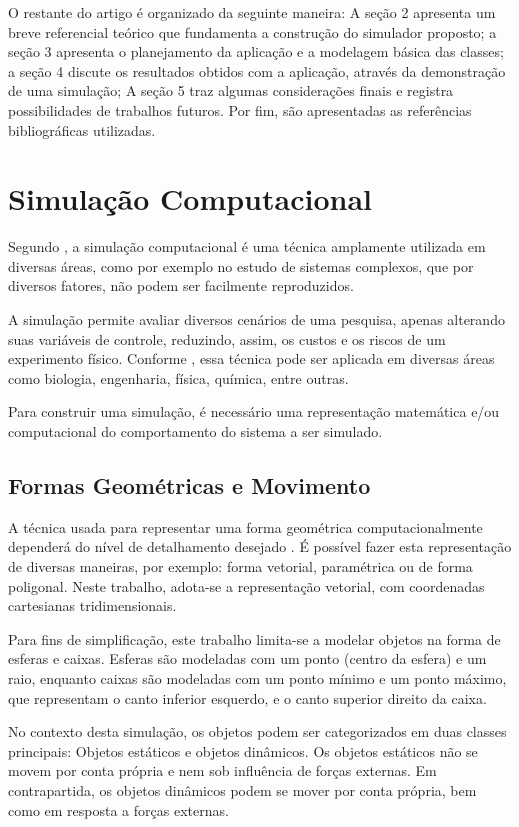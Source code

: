 \documentclass[12pt]{article}
\begin{document}
O restante do artigo é organizado da seguinte maneira: A seção 2 apresenta um breve referencial teórico que fundamenta a construção do simulador proposto; a seção 3 apresenta o planejamento da aplicação e a modelagem básica das classes; a seção 4 discute os resultados obtidos com a aplicação, através da demonstração de uma simulação; A seção 5 traz algumas considerações finais e registra possibilidades de trabalhos futuros. Por fim, são apresentadas as referências bibliográficas utilizadas.

\section{Simulação Computacional}

Segundo \cite{duran2018computer}, a simulação computacional é uma técnica amplamente utilizada em diversas áreas, como por exemplo no estudo de sistemas complexos, que por diversos fatores, não podem ser facilmente reproduzidos.

A simulação permite avaliar diversos cenários de uma pesquisa, apenas alterando suas variáveis de controle, reduzindo, assim, os custos e os riscos de um experimento físico. Conforme \cite{marschner2018}, essa técnica pode ser aplicada em diversas áreas como biologia, engenharia, física, química, entre outras.

Para construir uma simulação, é necessário uma representação matemática e/ou computacional do comportamento do sistema a ser simulado.

\subsection{Formas Geométricas e Movimento}
A técnica usada para representar uma forma geométrica computacionalmente dependerá do nível de detalhamento desejado \cite{pharr2016}. É possível fazer esta representação de diversas maneiras, por exemplo: forma vetorial, paramétrica ou de forma poligonal. Neste trabalho, adota-se a representação vetorial, com coordenadas cartesianas tridimensionais.

Para fins de simplificação, este trabalho limita-se a modelar objetos na forma de esferas e caixas. Esferas são modeladas com um ponto (centro da esfera) e um raio, enquanto caixas são modeladas com um ponto mínimo e um ponto máximo, que representam o canto inferior esquerdo, e o canto superior direito da caixa.

No contexto desta simulação, os objetos podem ser categorizados em duas classes principais: Objetos estáticos e objetos dinâmicos. Os objetos estáticos não se movem por conta própria e nem sob influência de forças externas. Em contrapartida, os objetos dinâmicos podem se mover por conta própria, bem como em resposta a forças externas.
\end{document}
